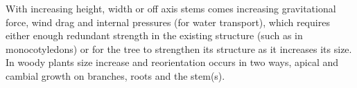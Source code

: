 With increasing height, width or off axis stems comes increasing gravitational
force, wind drag and internal pressures (for water transport), which requires
either enough redundant strength in the existing structure (such as in
monocotyledons) or for the tree to strengthen its structure as it increases its
size. In woody plants size increase and reorientation occurs in
two ways, apical and cambial growth on branches, roots and the stem(s).